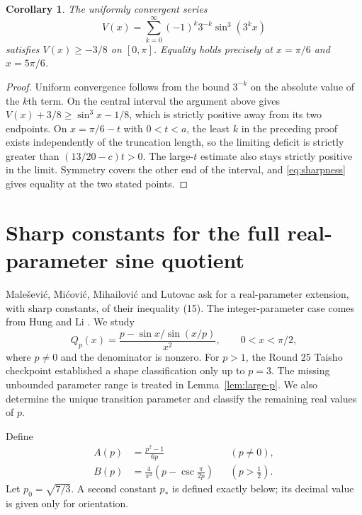 \documentclass[11pt,a4paper]{article}
\numberwithin{equation}{section}
\newtheorem{corollary}[theorem]{Corollary}
\theoremstyle{remark}
\begin{document}
\begin{corollary}\label{cor:infinite-sine}
The uniformly convergent series
\[
 V(x)=\sum_{k=0}^{\infty}(-1)^k3^{-k}\sin^3(3^kx)
\]
satisfies $V(x)\ge-3/8$ on $[0,\pi]$. Equality holds precisely
at $x=\pi/6$ and $x=5\pi/6$.
\end{corollary}

\begin{proof}
Uniform convergence follows from the bound $3^{-k}$ on the absolute
value of the $k$th term. On the central interval the argument above
gives $V(x)+3/8\ge\sin^3x-1/8$, which is strictly positive away
from its two endpoints. On $x=\pi/6-t$ with $0<t<a$, the least
$k$ in the preceding proof exists independently of the truncation
length, so the limiting deficit is strictly greater than
$(13/20-c)t>0$. The large-$t$ estimate also stays strictly positive
in the limit. Symmetry covers the other end of the interval, and
\eqref{eq:sharpness} gives equality at the two stated points.
\end{proof}

\section{Sharp constants for the full real-parameter sine quotient}
\label{sec:sinequotient}

Male\v sevi\'c, Mi\'covi\'c, Mihailovi\'c and Lutovac
\cite[Section 5]{Malesevic} ask for a real-parameter extension,
with sharp constants, of their inequality (15). The integer-parameter
case comes from Hung and Li \cite{HungLi}. We study
\begin{equation}\label{eq:Qdef}
 Q_p(x)=\frac{p-\sin x/\sin(x/p)}{x^2},\qquad 0<x<\pi/2,
\end{equation}
where $p\ne0$ and the denominator is nonzero. For $p>1$, the
Round 25 Taisho checkpoint established a shape classification only
up to $p=3$. The missing unbounded parameter range is treated in
Lemma~\ref{lem:large-p}. We also determine the unique transition
parameter and classify the remaining real values of $p$.

Define
\begin{equation}\label{eq:endpoint-Q}
 \begin{aligned}
 A(p)&=\frac{p^2-1}{6p} &&(p\ne0),\\
 B(p)&=\frac4{\pi^2}\left(p-\csc\frac{\pi}{2p}\right)
       &&\left(p>\frac12\right).
 \end{aligned}
\end{equation}
Let $p_0=\sqrt{7/3}$. A second constant $p_*$ is defined exactly
below; its decimal value is given only for orientation.
\end{document}
